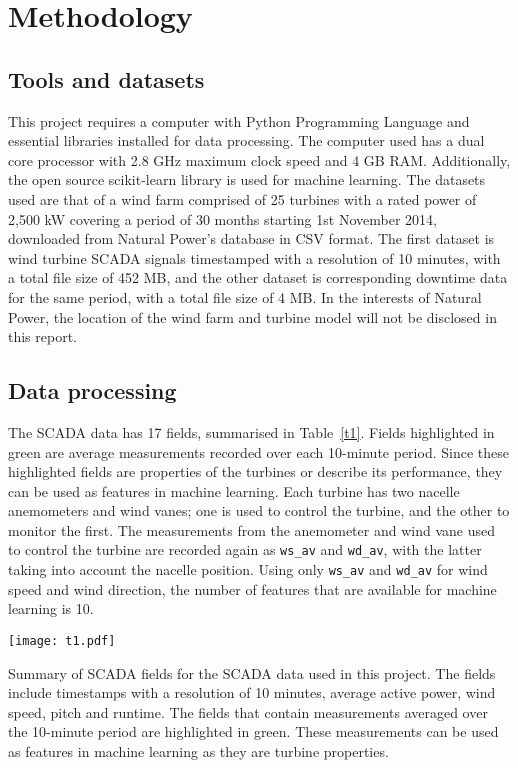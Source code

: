 
\chapter{Methodology}

\section{Tools and datasets}

This project requires a computer with Python Programming Language \cite{Welco} and essential libraries installed for data processing. The computer used has a dual core processor with 2.8 GHz maximum clock speed and 4 GB RAM. Additionally, the open source scikit-learn library \cite{Pedre11} is used for machine learning. The datasets used are that of a wind farm comprised of 25 turbines with a rated power of 2,500 kW covering a period of 30 months starting 1st November 2014, downloaded from Natural Power’s database in CSV format. The first dataset is wind turbine SCADA signals timestamped with a resolution of 10 minutes, with a total file size of 452 MB, and the other dataset is corresponding downtime data for the same period, with a total file size of 4 MB. In the interests of Natural Power, the location of the wind farm and turbine model will not be disclosed in this report.

\section{Data processing}

The SCADA data has 17 fields, summarised in Table~\ref{t1}. Fields highlighted in green are average measurements recorded over each 10-minute period. Since these highlighted fields are properties of the turbines or describe its performance, they can be used as features in machine learning. Each turbine has two nacelle anemometers and wind vanes; one is used to control the turbine, and the other to monitor the first. The measurements from the anemometer and wind vane used to control the turbine are recorded again as \texttt{ws\_av} and \texttt{wd\_av}, with the latter taking into account the nacelle position. Using only \texttt{ws\_av} and \texttt{wd\_av} for wind speed and wind direction, the number of features that are available for machine learning is 10.

\begin{table}
    \centering
    \texttt{[image: t1.pdf]}
    \caption{\label{t1}Summary of SCADA fields for the SCADA data used in this project. The fields include timestamps with a resolution of 10 minutes, average active power, wind speed, pitch and runtime. The fields that contain measurements averaged over the 10-minute period are highlighted in green. These measurements can be used as features in machine learning as they are turbine properties.}
\end{table}

